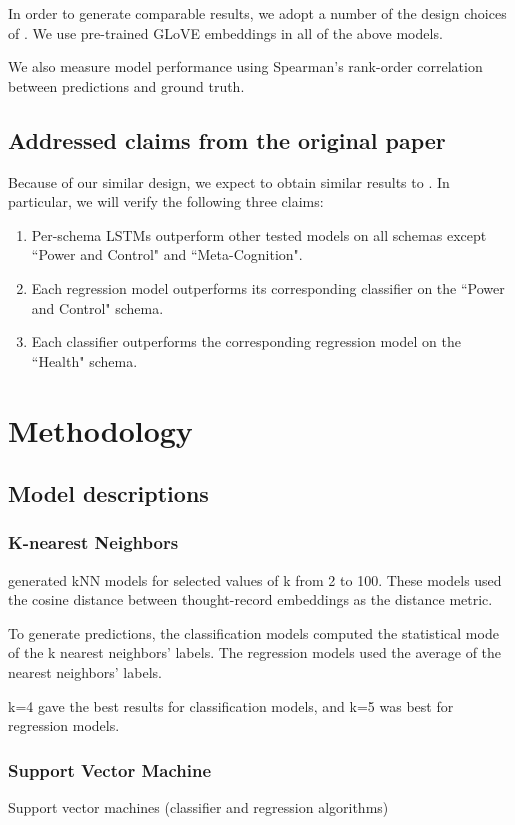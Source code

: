 \documentclass[11pt,a4paper]{article}
\begin{document}
In order to generate comparable results, we adopt a number of the design choices of \citeauthor{burger_2021}. We use pre-trained GLoVE embeddings \citep{pennington_2014} in all of the above models. 

We also measure model performance using Spearman's rank-order correlation between predictions and ground truth. 

\subsection{Addressed claims from the original paper}
\label{claims}
Because of our similar design, we expect to obtain similar results to \citeauthor{burger_2021}. In particular, we will verify the following three claims:
\begin{enumerate}
    \item Per-schema LSTMs outperform other tested models on all schemas except ``Power and Control" and ``Meta-Cognition".
    \item Each regression model outperforms its corresponding classifier on the ``Power and Control" schema.
    \item Each classifier outperforms the corresponding regression model on the ``Health" schema.
\end{enumerate}

\section{Methodology}
\subsection{Model descriptions}
\subsubsection{K-nearest Neighbors}
\citeauthor{burger_2021} generated kNN models for selected values of k from 2 to 100. These models used the cosine distance between thought-record embeddings as the distance metric.

To generate predictions, the classification models computed the statistical mode of the k nearest neighbors' labels. The regression models used the average of the nearest neighbors' labels.

k=4 gave the best results for classification models, and k=5 was best for regression models.

\subsubsection{Support Vector Machine}
Support vector machines (classifier and regression algorithms)
\end{document}
